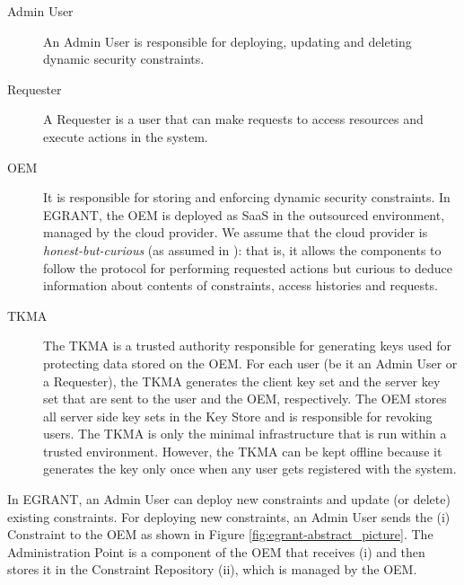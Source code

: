 \documentclass[epsfig,a4paper,11pt,titlepage]{book}
\numberwithin{algorithm}{chapter}
\begin{document}
\begin{description}

	\item[Admin User] An Admin User is responsible for deploying, updating and deleting dynamic security constraints.
	
	\item[Requester] A Requester is a user that can make requests to access resources and execute actions in the system.

	\item[\gls{OEM}] It is responsible for storing and enforcing dynamic security constraints. In \gls{EGRANT}, the \gls{OEM} is deployed as \gls{SaaS} in the outsourced environment, managed by the cloud provider. We assume that the cloud provider is \emph{honest-but-curious} (as assumed in \cite{Vimercati:2010, Vimercati:2007:VLDB}): that is, it allows the components to follow the protocol for performing requested actions but curious to deduce information about contents of constraints, access histories and requests.
	
	\item[\acrfull{TKMA}] The \gls{TKMA} is a trusted authority responsible for generating keys used for protecting data stored on the \gls{OEM}. For each user (be it an Admin User or a Requester), the \gls{TKMA} generates the client key set and the server key set that are sent to the user and the \gls{OEM}, respectively. The \gls{OEM} stores all server side key sets in the Key Store and is responsible for revoking users. The \gls{TKMA} is only the minimal infrastructure that is run within a trusted environment. However, the \gls{TKMA} can be kept offline because it generates the key only once when any user gets registered with the system.	
	
\end{description}

In \gls{EGRANT}, an Admin User can deploy new constraints and update (or delete) existing constraints. For deploying new constraints, an Admin User sends the (i) Constraint to the \gls{OEM} as shown in Figure \ref{fig:egrant-abstract_picture}. The Administration Point is a component of the \gls{OEM} that receives (i) and then stores it in the Constraint Repository (ii), which is managed by the \gls{OEM}.
\end{document}
